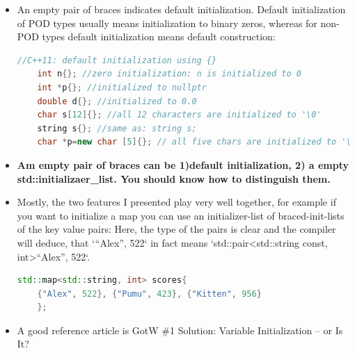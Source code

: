 \documentclass[a4paper,12pt,twoside]{book}
\begin{document}
\begin{itemize}
	\item An empty pair of braces indicates default initialization. Default initialization of POD types usually means initialization to binary zeros, whereas for non-POD types default initialization means default construction:
	
	\begin{lstlisting}[frame=single, language=c++,mathescape=true]
	//C++11: default initialization using {}
	int n{}; //zero initialization: n is initialized to 0
	int *p{}; //initialized to nullptr
	double d{}; //initialized to 0.0
	char s[12]{}; //all 12 characters are initialized to '\0'
	string s{}; //same as: string s;
	char *p=new char [5]{}; // all five chars are initialized to '\0'
	\end{lstlisting}
	
	\item \textbf{Am empty pair of braces can be 1)default initialization, 2) a empty std::initializaer\_list. You should know how to distinguish them. }
	
	
	
	
	
	\item Mostly, the two features I presented play very well together, for example if you want to initialize a map you can use an initializer-list of braced-init-lists of the key value pairs: Here, the type of the pairs is clear and the compiler will deduce, that `{“Alex”, 522}` in fact means `std::pair<std::string const, int>{“Alex”, 522}`.
	
	\begin{lstlisting}[frame=single, language=c++,mathescape=true]
	std::map<std::string, int> scores{ 
	{"Alex", 522}, {"Pumu", 423}, {"Kitten", 956} 
	};
	\end{lstlisting}
	
	
	\item A good reference article is GotW \#1 Solution: Variable Initialization – or Is It?
	
	
	
\end{itemize}
\end{document}
